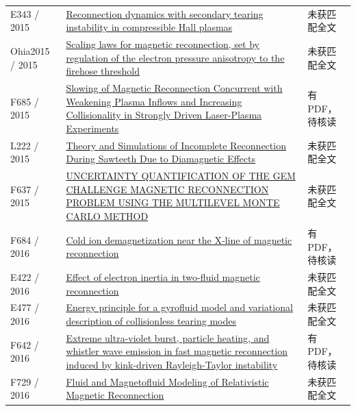 \documentclass[UTF8,a4paper,11pt,openany,fontset=fandol]{ctexbook}
\begin{document}
\begin{longtable}{P{24mm}P{97mm}P{27mm}}
E343 / 2015 & \href{https://doi.org/10.1063/1.4922057}{Reconnection dynamics with secondary tearing instability in compressible Hall plasmas} & 未获匹配全文\\

Ohia2015 / 2015 & \href{https://doi.org/10.1002/2015GL067117}{Scaling laws for magnetic reconnection,  set by regulation of the electron pressure anisotropy to the firehose threshold} & 未获匹配全文\\

F685 / 2015 & \href{https://doi.org/10.1103/physrevlett.114.205004}{Slowing of Magnetic Reconnection Concurrent with Weakening Plasma Inflows and Increasing Collisionality in Strongly Driven Laser-Plasma Experiments} & 有PDF，待核读\\

L222 / 2015 & \href{https://doi.org/10.33915/etd.5178}{Theory and Simulations of Incomplete Reconnection During Sawteeth Due to Diamagnetic Effects} & 未获匹配全文\\

F637 / 2015 & \href{https://doi.org/10.1615/int.j.uncertaintyquantification.2015006492}{UNCERTAINTY QUANTIFICATION OF THE GEM CHALLENGE MAGNETIC RECONNECTION PROBLEM USING THE MULTILEVEL MONTE CARLO METHOD} & 未获匹配全文\\

F684 / 2016 & \href{https://doi.org/10.1002/2016gl069877}{Cold ion demagnetization near the X‐line of magnetic reconnection} & 有PDF，待核读\\

E422 / 2016 & \href{http://ui.adsabs.harvard.edu/abs/2016cosp...41E.697G/abstract}{Effect of electron inertia in two-fluid magnetic reconnection} & 未获匹配全文\\

E477 / 2016 & \href{http://absimage.aps.org/image/DPP16/MWS_DPP16-2016-000949.pdf}{Energy principle for a gyrofluid model and variational description of collisionless tearing modes} & 未获匹配全文\\

F642 / 2016 & \href{https://doi.org/10.1063/1.4944390}{Extreme ultra-violet burst,  particle heating,  and whistler wave emission in fast magnetic reconnection induced by kink-driven Rayleigh-Taylor instability} & 有PDF，待核读\\

F729 / 2016 & \href{http://citeseerx.ist.psu.edu/viewdoc/summary?doi=10.1.1.743.7627}{Fluid and Magnetofluid Modeling of Relativistic Magnetic Reconnection} & 未获匹配全文\\


\end{longtable}
\end{document}
